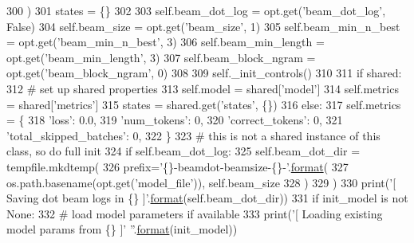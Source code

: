 \begin{DoxyCode}
300         )
301         states = \{\}
302 
303         self.beam\_dot\_log = opt.get(\textcolor{stringliteral}{'beam\_dot\_log'}, \textcolor{keyword}{False})
304         self.beam\_size = opt.get(\textcolor{stringliteral}{'beam\_size'}, 1)
305         self.beam\_min\_n\_best = opt.get(\textcolor{stringliteral}{'beam\_min\_n\_best'}, 3)
306         self.beam\_min\_length = opt.get(\textcolor{stringliteral}{'beam\_min\_length'}, 3)
307         self.beam\_block\_ngram = opt.get(\textcolor{stringliteral}{'beam\_block\_ngram'}, 0)
308 
309         self.\_init\_controls()
310 
311         \textcolor{keywordflow}{if} shared:
312             \textcolor{comment}{# set up shared properties}
313             self.model = shared[\textcolor{stringliteral}{'model'}]
314             self.metrics = shared[\textcolor{stringliteral}{'metrics'}]
315             states = shared.get(\textcolor{stringliteral}{'states'}, \{\})
316         \textcolor{keywordflow}{else}:
317             self.metrics = \{
318                 \textcolor{stringliteral}{'loss'}: 0.0,
319                 \textcolor{stringliteral}{'num\_tokens'}: 0,
320                 \textcolor{stringliteral}{'correct\_tokens'}: 0,
321                 \textcolor{stringliteral}{'total\_skipped\_batches'}: 0,
322             \}
323             \textcolor{comment}{# this is not a shared instance of this class, so do full init}
324             \textcolor{keywordflow}{if} self.beam\_dot\_log:
325                 self.beam\_dot\_dir = tempfile.mkdtemp(
326                     prefix=\textcolor{stringliteral}{'\{\}-beamdot-beamsize-\{\}-'}.\hyperlink{namespaceparlai_1_1chat__service_1_1services_1_1messenger_1_1shared__utils_a32e2e2022b824fbaf80c747160b52a76}{format}(
327                         os.path.basename(opt.get(\textcolor{stringliteral}{'model\_file'})), self.beam\_size
328                     )
329                 )
330                 print(\textcolor{stringliteral}{'[ Saving dot beam logs in \{\} ]'}.\hyperlink{namespaceparlai_1_1chat__service_1_1services_1_1messenger_1_1shared__utils_a32e2e2022b824fbaf80c747160b52a76}{format}(self.beam\_dot\_dir))
331             \textcolor{keywordflow}{if} init\_model \textcolor{keywordflow}{is} \textcolor{keywordflow}{not} \textcolor{keywordtype}{None}:
332                 \textcolor{comment}{# load model parameters if available}
333                 print(\textcolor{stringliteral}{'[ Loading existing model params from \{\} ]'} \textcolor{stringliteral}{''}.\hyperlink{namespaceparlai_1_1chat__service_1_1services_1_1messenger_1_1shared__utils_a32e2e2022b824fbaf80c747160b52a76}{format}(init\_model))

\end{DoxyCode}
